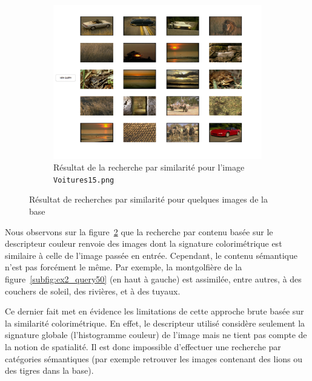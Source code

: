 \documentclass[a4paper]{article}
\newcommand{\figref}[1]{figure~\ref{#1}}
\begin{document}
\begin{figure}[H]
\begin{subfigure}[c]{0.6\textwidth}
    \end{subfigure}
    \begin{subfigure}[c]{0.6\textwidth}
        \centering
        \includegraphics[width=\textwidth]{images/query950.png}
        \caption{Résultat de la recherche par similarité pour l'image
    \texttt{Voitures15.png}}
        \label{subfig:ex2_query950}
    \end{subfigure}

    \caption{Résultat de recherches par similarité pour quelques images de la
    base}
    \label{fig:ex2_queries}

\end{figure}

Nous observons sur la \figref{fig:ex2_queries} que la recherche par contenu
basée sur le descripteur couleur renvoie des images dont la signature
colorimétrique est similaire à celle de l'image passée en entrée. Cependant, le
contenu sémantique n'est pas forcément le même. Par exemple, la montgolfière de
la \figref{subfig:ex2_query50} (en haut à gauche) est assimilée, entre autres,
à des couchers de soleil, des rivières, et à des tuyaux.

Ce dernier fait met en évidence les limitations de cette approche brute basée
sur la similarité colorimétrique. En effet, le descripteur utilisé considère
seulement la signature globale (l'histogramme couleur) de l'image mais ne tient
pas compte de la notion de spatialité. Il est donc impossible d'effectuer une
recherche par catégories sémantiques (par exemple retrouver les images contenant
des lions ou des tigres dans la base).
\end{document}

